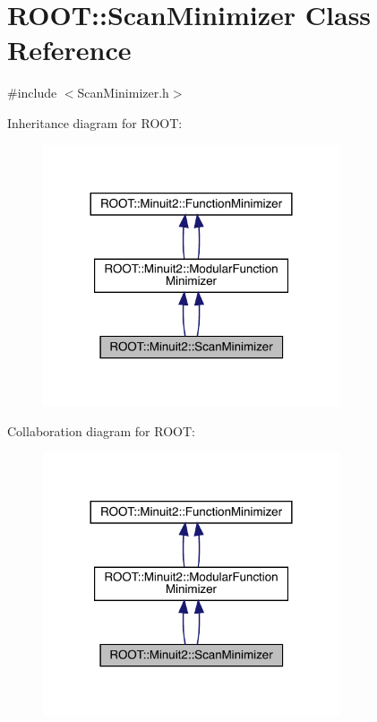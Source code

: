 \hypertarget{classROOT_1_1Minuit2_1_1ScanMinimizer}{}\section{R\+O\+OT\+:\+:Scan\+Minimizer Class Reference}
\label{classROOT_1_1Minuit2_1_1ScanMinimizer}


{\ttfamily \#include $<$Scan\+Minimizer.\+h$>$}



Inheritance diagram for R\+O\+OT\+:\nopagebreak
\begin{figure}[H]
\begin{center}
\leavevmode
\includegraphics[width=248pt]{d9/d18/classROOT_1_1Minuit2_1_1ScanMinimizer__inherit__graph}
\end{center}
\end{figure}


Collaboration diagram for R\+O\+OT\+:\nopagebreak
\begin{figure}[H]
\begin{center}
\leavevmode
\includegraphics[width=248pt]{db/d7a/classROOT_1_1Minuit2_1_1ScanMinimizer__coll__graph}
\end{center}
\end{figure}
